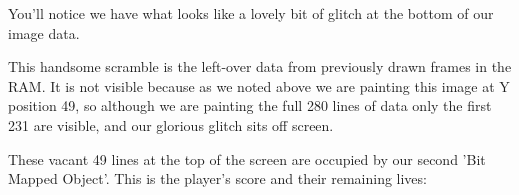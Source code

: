 You'll notice we have what looks like a lovely bit of glitch at the bottom of our image data.

\begin{figure}[H]
    \centering
    \begin{adjustbox}{width=11cm,center}
    \end{adjustbox}
\end{figure}

This handsome scramble is the left-over data from previously drawn frames in the RAM. It
is not visible because as we noted above we are painting this image at Y position 49, so
although we are painting the full 280 lines of data only the first 231 are visible, and
our glorious glitch sits off screen.

These vacant 49 lines at the top of the screen are occupied by our second 'Bit Mapped Object'.
This is the player's score and their remaining lives:


